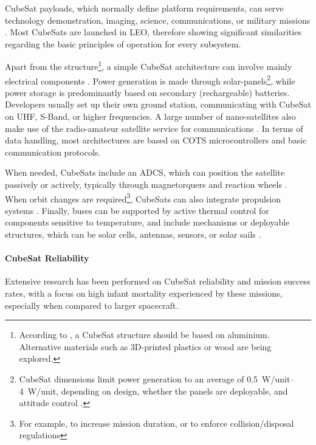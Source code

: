 \documentclass[a4paper,nobib,justified,final]{tufte-book}
\begin{document}
CubeSat payloads, which normally define platform requirements, can serve technology demonstration, imaging, science, communications, or military missions \autocite{berthoudHowSetCubeSat2016}. Most CubeSats are launched in \ac{LEO}, therefore showing significant similarities regarding the basic principles of operation for every subsystem.


Apart from the structure\footnote{According to \cite{CDS14}, a CubeSat structure should be based on aluminium. Alternative materials such as 3D-printed plastics \cite{grimMakerSatCubeSatDesigned2016} or wood \cite{guentherWoodWoodBasedMaterials2024} are being explored.}, a simple CubeSat architecture can involve mainly electrical components \autocite{equisat}. Power generation is made through solar-panels\footnote{CubeSat dimensions limit power generation to an average of \qtyrange{0.5}{4}{\watt/unit}, depending on design, whether the panels are deployable, and attitude control \cite{SMAD}.}, while power storage is predominantly based on secondary (rechargeable) batteries. Developers usually set up their own ground station, communicating with CubeSat on \acs{UHF}, S-Band, or higher frequencies. A large number of nano-satellites also make use of the radio-amateur satellite service for communications \autocite{nasacubesatlaunchinitiativeCubeSat101Basic2017}. In terms of data handling, most architectures are based on \acs{COTS} microcontrollers and basic communication protocols.

When needed, CubeSats include an \acl{ADCS}, which can position the satellite passively or actively, typically through magnetorquers and reaction wheels \autocite{bouwmeesterSurveyWorldwidePico2010}. When orbit changes are required\footnote{For example, to increase mission duration, or to enforce collision/disposal regulations}, CubeSats can also integrate propulsion systems \autocite{CDS14}. Finally, buses can be supported by active thermal control for components sensitive to temperature, and include mechanisms or deployable structures, which can be solar cells, antennas, sensors, or solar sails \autocite{cappellettiCubeSatHandbookMission2021}.

\paragraph{CubeSat Reliability}
\label{sec:LITERATURE_cubesat_reliability}

Extensive research has been performed on CubeSat reliability and mission success rates, with a focus on high infant mortality experienced by these missions, especially when compared to larger spacecraft.
\end{document}
